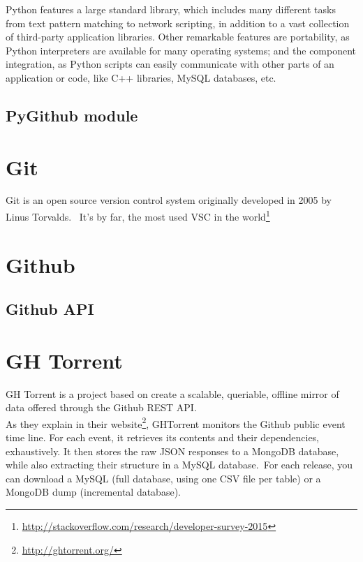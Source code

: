 \documentclass[a4paper, 12pt]{book}
\begin{document}
Python features a large standard library, which includes many different tasks from text pattern matching to network scripting, in addition to a vast collection of third-party application libraries.
Other remarkable features are portability, as Python interpreters are available for many operating systems; and the component integration, as Python scripts can easily communicate with other parts of an application or code, like C++ libraries, MySQL databases, etc.\\

\subsection{PyGithub module}
\label{sec:pygithub}

\section{Git}
\label{sec:git}
Git is an open source version control system originally developed in 2005 by Linus Torvalds. \
It's by far, the most used VSC in the world\footnote{\url{http://stackoverflow.com/research/developer-survey-2015}}

\section{Github}
\label{sec:github}

\subsection{Github API}

\section{GH Torrent}
\label{sec:ghtorrent}
GH Torrent is a project based on create a scalable, queriable, offline mirror of data offered through the Github REST API.\\
As they explain in their website\footnote{\url{http://ghtorrent.org/}}, GHTorrent monitors the Github public event time line. For each event, it retrieves its contents and their dependencies, exhaustively. It then stores the raw JSON responses to a MongoDB database, while also extracting their structure in a MySQL database.\
For each release, you can download a MySQL (full database, using one CSV file per table) or a MongoDB dump (incremental database).\\
\end{document}
